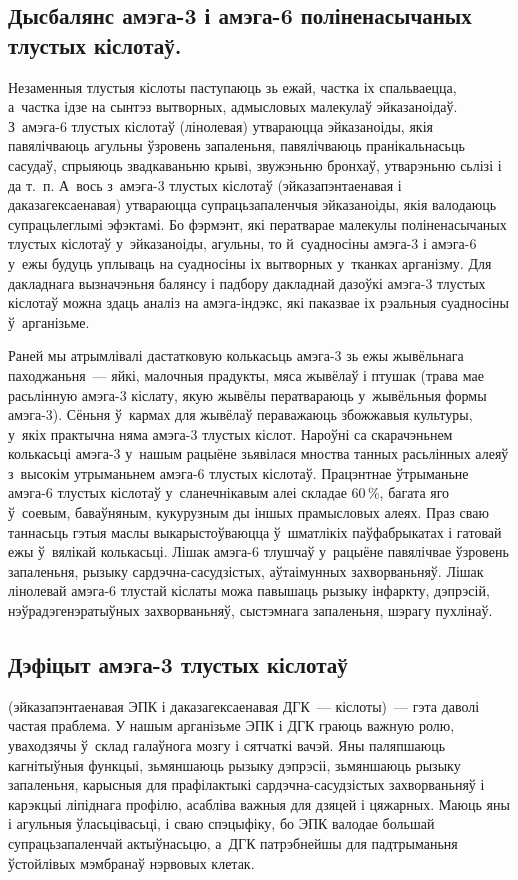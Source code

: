 \subsection{Дысбалянс амэга-3 і амэга-6 поліненасычаных тлустых кіслотаў.}
Незаменныя тлустыя кіслоты паступаюць зь ежай, частка іх спальваецца, а~частка ідзе на сынтэз вытворных, адмысловых малекулаў эйказаноідаў. З~амэга-6 тлустых кіслотаў (лінолевая) утвараюцца эйказаноіды, якія павялічваюць агульны ўзровень запаленьня, павялічваюць пранікальнасьць сасудаў, спрыяюць звадкаваньню крыві, звужэньню бронхаў, утварэньню сьлізі і да т.~п. А~вось з~амэга-3 тлустых кіслотаў (эйказапэнтаенавая і даказагексаенавая) утвараюцца супрацьзапаленчыя эйказаноіды, якія валодаюць супрацьлеглымі эфэктамі. Бо фэрмэнт, які ператварае малекулы поліненасычаных тлустых кіслотаў у~эйказаноіды, агульны, то й~суадносіны амэга-3 і амэга-6 у~ежы будуць уплываць на суадносіны іх вытворных у~тканках арганізму. Для дакладнага вызначэньня балянсу і падбору дакладнай дазоўкі амэга-3 тлустых кіслотаў можна здаць аналіз на амэга-індэкс, які паказвае іх рэальныя суадносіны ў~арганізьме.


Раней мы атрымлівалі дастатковую колькасьць амэга-3 зь ежы жывёльнага паходжаньня~--- яйкі, малочныя прадукты, мяса жывёлаў і птушак (трава мае расьлінную амэга-3 кіслату, якую жывёлы ператвараюць у~жывёльныя формы амэга-3). Сёньня ў~кармах для жывёлаў пераважаюць збожжавыя культуры, у~якіх практычна няма амэга-3 тлустых кіслот. Нароўні са скарачэньнем колькасьці амэга-3 у~нашым рацыёне зьявілася мноства танных расьлінных алеяў з~высокім утрыманьнем амэга-6 тлустых кіслотаў. Працэнтнае ўтрыманьне амэга-6 тлустых кіслотаў у~сланечнікавым алеі складае 60\,\%, багата яго ў~соевым, баваўняным, кукурузным ды іншых прамысловых алеях. Праз сваю таннасьць гэтыя маслы выкарыстоўваюцца ў~шматлікіх паўфабрыкатах і гатовай ежы ў~вялікай колькасьці. Лішак амэга-6 тлушчаў у~рацыёне павялічвае ўзровень запаленьня, рызыку сардэчна-сасудзістых, аўтаімунных захворваньняў. Лішак лінолевай амэга-6 тлустай кіслаты можа павышаць рызыку інфаркту, дэпрэсій, нэўрадэгенэратыўных захворваньняў, сыстэмнага запаленьня, шэрагу пухлінаў.

\subsection{Дэфіцыт амэга-3 тлустых кіслотаў} (эйказапэнтаенавая ЭПК і даказагексаенавая ДГК~--- кіслоты)~--- гэта даволі частая праблема.
У нашым арганізьме ЭПК і ДГК граюць важную ролю, уваходзячы ў~склад галаўнога мозгу і сятчаткі вачэй. Яны паляпшаюць кагнітыўныя функцыі, зьмяншаюць рызыку дэпрэсіі, зьмяншаюць рызыку запаленьня, карысныя для прафілактыкі сардэчна-сасудзістых захворваньняў і карэкцыі ліпіднага профілю, асабліва важныя для дзяцей і цяжарных. Маюць яны і агульныя ўласьцівасьці, і сваю спэцыфіку, бо ЭПК валодае большай супрацьзапаленчай актыўнасьцю, а~ДГК патрэбнейшы для падтрыманьня ўстойлівых мэмбранаў нэрвовых клетак.

